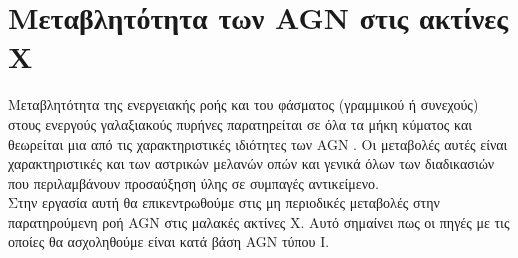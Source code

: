 \chapter{Μεταβλητότητα των \textlatin{AGN} στις ακτίνες Χ} \label{framework}





 
Mεταβλητότητα της ενεργειακής ροής και του φάσματος (γραμμικού ή συνεχούς) στους ενεργούς γαλαξιακούς πυρήνες παρατηρείται σε όλα τα μήκη κύματος και θεωρείται μια από τις χαρακτηριστικές ιδιότητες των \textlatin{AGN} \cite{netzer_2013}. Οι μεταβολές αυτές είναι χαρακτηριστικές και των αστρικών μελανών οπών και γενικά όλων των διαδικασιών που περιλαμβάνουν προσαύξηση ύλης σε συμπαγές αντικείμενο.\\
Στην εργασία αυτή θα επικεντρωθούμε στις μη περιοδικές μεταβολές στην παρατηρούμενη ροή \textlatin{AGN} στις μαλακές ακτίνες Χ. Αυτό σημαίνει πως οι πηγές με τις οποίες θα ασχοληθούμε είναι κατά βάση \textlatin{AGN} τύπου Ι. 


